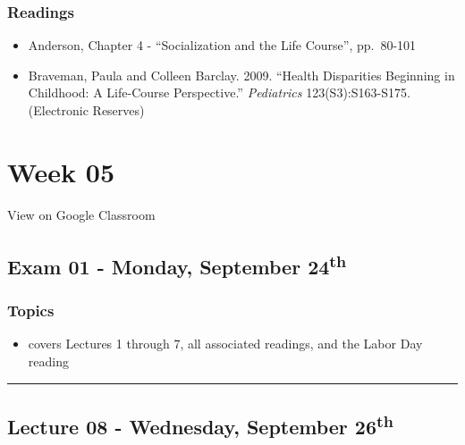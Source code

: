 \documentclass[]{book}
\providecommand{\tightlist}{%
  \setlength{\itemsep}{0pt}\setlength{\parskip}{0pt}}
\theoremstyle{definition}
\theoremstyle{definition}
\theoremstyle{definition}
\theoremstyle{remark}
\begin{document}
\hypertarget{readings-7}{%
\subsubsection*{Readings}\label{readings-7}}

\begin{itemize}
\tightlist
\item
  Anderson, Chapter 4 - ``Socialization and the Life Course'',
  pp.~80-101
\item
  Braveman, Paula and Colleen Barclay. 2009. ``Health Disparities
  Beginning in Childhood: A Life-Course Perspective.'' \emph{Pediatrics}
  123(S3):S163-S175. (Electronic Reserves)
\end{itemize}

\hypertarget{week-05}{%
\section*{Week 05}\label{week-05}}

View on Google Classroom

\hypertarget{exam-01---monday-september-24th}{%
\subsection*{\texorpdfstring{Exam 01 - Monday, September
24\textsuperscript{th}}{Exam 01 - Monday, September 24th}}\label{exam-01---monday-september-24th}}

\hypertarget{topics-8}{%
\subsubsection*{Topics}\label{topics-8}}

\begin{itemize}
\tightlist
\item
  covers Lectures 1 through 7, all associated readings, and the Labor
  Day reading
\end{itemize}

\begin{center}\rule{0.5\linewidth}{\linethickness}\end{center}

\hypertarget{lecture-08---wednesday-september-26th}{%
\subsection*{\texorpdfstring{Lecture 08 - Wednesday, September
26\textsuperscript{th}}{Lecture 08 - Wednesday, September 26th}}\label{lecture-08---wednesday-september-26th}}
\end{document}
